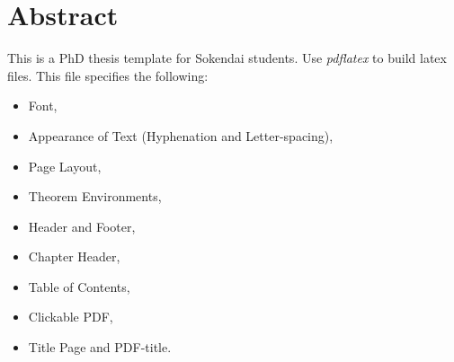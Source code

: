 \chapter*{Abstract}

This is a PhD thesis template for Sokendai students.
Use \textit{pdflatex} to build latex files.
This file specifies the following:
\begin{itemize}
	\item Font,
	\item Appearance of Text (Hyphenation and Letter-spacing),
	\item Page Layout,
	\item Theorem Environments,
	\item Header and Footer,
	\item Chapter Header,
	\item Table of Contents,
	\item Clickable PDF,
	\item Title Page and PDF-title.
\end{itemize}

